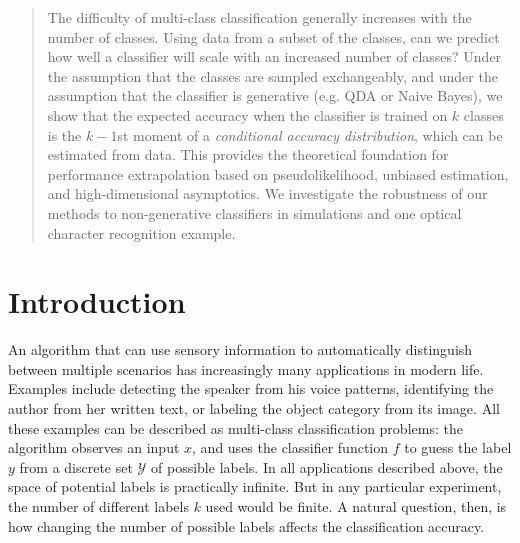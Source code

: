 \documentclass[12pt]{article}
\begin{document}
\maketitle

\newcommand{\skone}{\mathcal{S}_{k_1}}
\newcommand{\sktwo}{\mathcal{S}_{k_2}}

\newcommand{\tr}{\text{tr}}
\newcommand{\E}{\textbf{E}}
\newcommand{\diag}{\text{diag}}
\newcommand{\argmax}{\text{argmax}}
\newcommand{\Cov}{\text{Cov}}
\newcommand{\Var}{\text{Var}}
\newcommand{\argmin}{\text{argmin}}
\newcommand{\Vol}{\text{Vol}}
\newcommand{\comm}[1]{}
\newcommand{\indep}{\rotatebox[origin=c]{90}{$\models$}}
\newcommand{\Cor}{\text{Cor}}
\newtheorem{theorem}{Theorem}[section]
\newtheorem{proposition}{Proposition}[section]
\newtheorem{corollary}{Corollary}[theorem]
\newtheorem{lemma}{Lemma}[section]
\newtheorem{definition}{Definition}[section]
\newcommand{\bZ}{\boldsymbol{Z}}
\newcommand{\bz}{\boldsymbol{z}}
\newcommand{\bx}{\boldsymbol{x}}
\newcommand{\bX}{\boldsymbol{X}}

\newcommand{\bH}{\boldsymbol{H}}


\begin{abstract}
The difficulty of multi-class classification generally increases with
the number of classes.  Using data from a subset of the classes, can
we predict how well a classifier will scale with an increased number
of classes?  Under the assumption that the classes are sampled
exchangeably, and under the assumption that the classifier is
generative (e.g. QDA or Naive Bayes), we show that the expected
accuracy when the classifier is trained on $k$ classes is the $k-1$st
moment of a \emph{conditional accuracy distribution}, which can be
estimated from data.  This provides the theoretical foundation for
performance extrapolation based on pseudolikelihood, unbiased
estimation, and high-dimensional asymptotics.  We investigate the
robustness of our methods to non-generative classifiers in simulations
and one optical character recognition example.
\end{abstract}

\section{Introduction}
An algorithm that can use sensory information to automatically
 distinguish between multiple scenarios has increasingly many applications
 in modern life. Examples include detecting the speaker from his voice patterns, 
identifying the author from her written text, or labeling the object 
category from its image. All these examples can be described as multi-class classification problems:
the algorithm observes an input $x$, and uses the classifier function $f$ to guess
the label $y$ from a discrete set $\mathcal{Y}$ of possible labels. 
In all applications described above, the space of potential labels is practically infinite.
But in any particular experiment, the number of different labels $k$ used would be finite.
A natural question, then, is how changing the number of 
possible labels affects the classification accuracy. 
\end{document}
